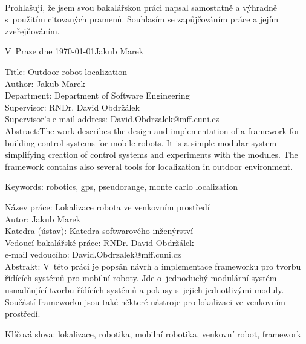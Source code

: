 \newpage
\setcounter{page}{2}
\ \vspace{10mm} 



\vspace{\fill}
\noindent Prohlašuji, že jsem svou bakalářskou práci napsal samostatně a
výhradně s~použitím citovaných pramenů. Souhlasím se zapůjčováním práce a
jejím zveřejňováním.

\bigskip
\noindent V~Praze dne \today\hspace{\fill}Jakub Marek\\


\tableofcontents

\newpage

\noindent
Title: Outdoor robot localization\\
Author: Jakub Marek\\
Department: Department of Software Engineering\\
Supervisor: RNDr. David Obdržálek\\
Supervisor's e-mail address: David.Obdrzalek@mff.cuni.cz\\

\noindent Abstract:The work describes the design and implementation
of a framework for building control systems for mobile robots.
It is a simple modular system simplifying creation of control systems and experiments with the modules.
The framework contains also several tools for localization in outdoor environment.

\noindent Keywords: robotics, gps, pseudorange, monte carlo localization

\vspace{10mm}

\noindent
Název práce: Lokalizace robota ve venkovním prostředí\\
Autor: Jakub Marek\\
Katedra (ústav): Katedra softwarového inženýrství\\
Vedoucí bakalářské práce: RNDr. David Obdržálek\\
e-mail vedoucího: David.Obdrzalek@mff.cuni.cz\\

\noindent Abstrakt: V~této práci je popsán návrh a implementace
frameworku pro tvorbu řídících systémů pro mobilní roboty.
Jde o~jednoduchý modulární systém
usnadňující tvorbu řídících systémů a pokusy s~jejich jednotlivými moduly.
Součástí frameworku jsou také některé nástroje pro lokalizaci ve venkovním prostředí.

\noindent Klíčová slova: lokalizace, robotika, mobilní robotika, venkovní robot, framework
